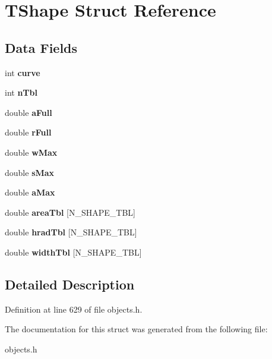 \hypertarget{struct_t_shape}{}\section{T\+Shape Struct Reference}
\label{struct_t_shape}
\subsection*{Data Fields}
\begin{DoxyCompactItemize}
\item 
\mbox{\label{struct_t_shape_ad61e4ff482e52b3da8c2f5e13dc3c73d}} 
int {\bfseries curve}
\item 
\mbox{\label{struct_t_shape_a430107c5ad502b4cd2b56a4a250252e4}} 
int {\bfseries n\+Tbl}
\item 
\mbox{\label{struct_t_shape_a9d2890c5999b2fbb9a446f7c101a5b6d}} 
double {\bfseries a\+Full}
\item 
\mbox{\label{struct_t_shape_adc6257ea0cf58dc33e2bd95ba6e72e44}} 
double {\bfseries r\+Full}
\item 
\mbox{\label{struct_t_shape_a378b132b872409c20a0a561c988bbb37}} 
double {\bfseries w\+Max}
\item 
\mbox{\label{struct_t_shape_a00e62bf08cf9aebdc0f40da1c6ea8595}} 
double {\bfseries s\+Max}
\item 
\mbox{\label{struct_t_shape_a3abaa4978bd7df5255c96806e3ddc262}} 
double {\bfseries a\+Max}
\item 
\mbox{\label{struct_t_shape_afd31a9bc4117c86f16ee2b173c08e0f2}} 
double {\bfseries area\+Tbl} \mbox{[}N\+\_\+\+S\+H\+A\+P\+E\+\_\+\+T\+BL\mbox{]}
\item 
\mbox{\label{struct_t_shape_adbfe099e6a904b10a68f4bc2514f8cb0}} 
double {\bfseries hrad\+Tbl} \mbox{[}N\+\_\+\+S\+H\+A\+P\+E\+\_\+\+T\+BL\mbox{]}
\item 
\mbox{\label{struct_t_shape_a7b0dff4d73858ab47413f8b28abfe52e}} 
double {\bfseries width\+Tbl} \mbox{[}N\+\_\+\+S\+H\+A\+P\+E\+\_\+\+T\+BL\mbox{]}
\end{DoxyCompactItemize}


\subsection{Detailed Description}


Definition at line 629 of file objects.\+h.



The documentation for this struct was generated from the following file\+:\begin{DoxyCompactItemize}
\item 
objects.\+h\end{DoxyCompactItemize}

